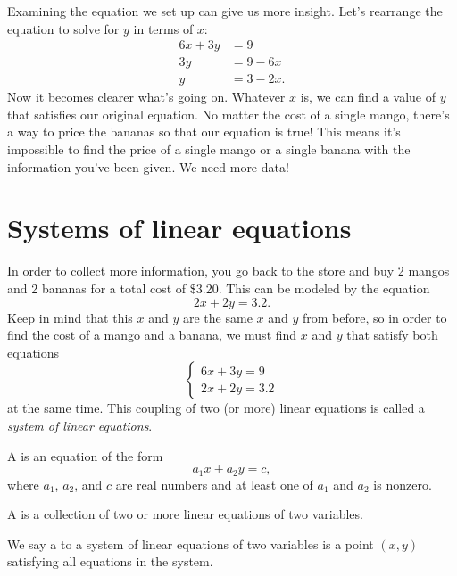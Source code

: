 \documentclass[nooutcomes]{ximera}
\begin{document}
Examining the equation we set up can give us more insight. Let's rearrange the equation to solve for $y$ in terms of $x$:
\begin{align*}
6x + 3y & = 9 \\
3y & = 9 - 6x \\
y & = 3 - 2x.
\end{align*}
Now it becomes clearer what's going on. Whatever $x$ is, we can find a value of $y$ that satisfies our original equation. No matter the cost of a single mango, there's a way to price the bananas so that our equation is true! This means it's impossible to find the price of a single mango or a single banana with the information you've been given. We need more data!



\section{Systems of linear equations}

In order to collect more information, you go back to the store and buy 2 mangos and 2 bananas for a total cost of \$3.20. This can be modeled by the equation 
$$
2x + 2y = 3.2.
$$
Keep in mind that this $x$ and $y$ are the same $x$ and $y$ from before, so in order to find the cost of a mango and a banana, we must find $x$ and $y$ that satisfy both equations
$$
\begin{cases}
6x + 3y = 9 \\
2x + 2y = 3.2
\end{cases}
$$
at the same time. This coupling of two (or more) linear equations is called a \emph{system of linear equations}.

\begin{definition}
A  is an equation of the form
$$
a_1 x + a_2 y = c,
$$
where $a_1$, $a_2$, and $c$ are real numbers and at least one of $a_1$ and 	$a_2$ is nonzero.

A  is a collection of two or more linear equations of two variables.

We say a  to a system of linear equations of two variables is a point $(x, y)$ satisfying all equations in the system. 
\end{definition}
\end{document}
